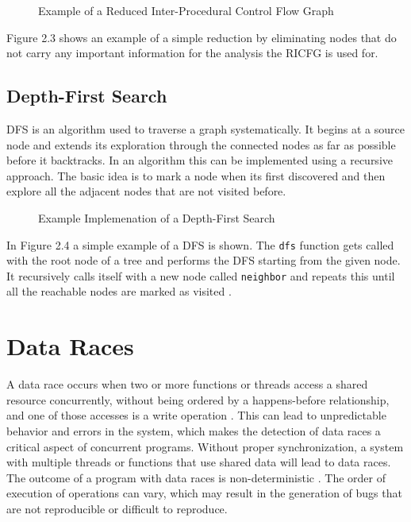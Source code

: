 \documentclass[
fancyheadings, %
%
%
]{stsreprt}
\begin{document}
{\begin{figure}[H]
\begin{tikzpicture}[node distance=2cm, scale=0.75, transform shape]
			\end{tikzpicture}
			\caption{Example of a Reduced Inter-Procedural Control Flow Graph}
		\end{figure}
		
		Figure 2.3 shows an example of a simple reduction by eliminating nodes that do not carry any important information for the analysis the RICFG is used for. 
		
		\subsection{Depth-First Search}
		\ac{DFS} is an algorithm used to traverse a graph systematically. It begins at a source node and extends its exploration through the connected nodes as far as possible before it backtracks. In an algorithm this can be implemented using a recursive approach. The basic idea is to mark a node when its first discovered and then explore all the adjacent nodes that are not visited before. 
		\begin{figure}[H]
			\centering
			\begin{algorithm}[H]
				\SetAlgoLined
				
			\end{algorithm}
			\caption{Example Implemenation of a Depth-First Search}
		\end{figure}
		In Figure 2.4 a simple example of a \ac{DFS} is shown. The \texttt{dfs} function gets called with the root node of a tree and performs the \ac{DFS} starting from the given node. It recursively calls itself with a new node called \texttt{neighbor} and repeats this until all the reachable nodes are marked as visited \cite{mehl2008}.
		
		
		\section{Data Races}
		
		A data race occurs when two or more functions or threads access a shared resource concurrently, without being ordered by a happens-before relationship, and one of those accesses is a write operation \cite{chen2011}. This can lead to unpredictable behavior and errors in the system, which makes the detection of data races a critical aspect of concurrent programs. Without proper synchronization, a system with multiple threads or functions that use shared data will lead to data races. The outcome of a program with data races is non-deterministic \cite{chen2011}. The order of execution of operations can vary, which may result in the generation of bugs that are not reproducible or difficult to reproduce. 
		
}
\end{document}
